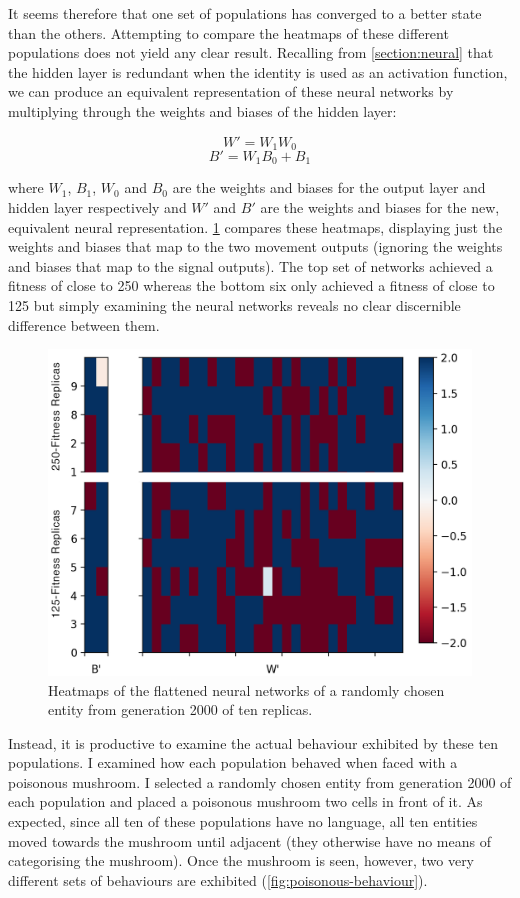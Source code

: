 \documentclass[12pt,a4paper]{report}
\begin{document}
It seems therefore that one set of populations has converged to a better state than the others. Attempting to compare the heatmaps of these different populations does not yield any clear result. Recalling from \cref{section:neural} that the hidden layer is redundant when the identity is used as an activation function, we can produce an equivalent representation of these neural networks by multiplying through the weights and biases of the hidden layer:

$$ W' = W_1 W_0 $$
$$ B' = W_1 B_0 + B_1 $$

where $W_1$, $B_1$, $W_0$ and $B_0$ are the weights and biases for the output layer and hidden layer respectively and $W'$ and $B'$ are the weights and biases for the new, equivalent neural representation. \cref{fig:compare} compares these heatmaps, displaying just the weights and biases that map to the two movement outputs (ignoring the weights and biases that map to the signal outputs). The top set of networks achieved a fitness of close to 250 whereas the bottom six only achieved a fitness of close to 125 but simply examining the neural networks reveals no clear discernible difference between them.

\begin{figure}[t]
  \centering
  \captionsetup{width=.9\linewidth}
  \includegraphics[width=.9\linewidth]{results/compare2}
  \caption{Heatmaps of the flattened neural networks of a randomly chosen entity from generation 2000 of ten replicas.}
  \label{fig:compare}
\end{figure}

Instead, it is productive to examine the actual behaviour exhibited by these ten populations. I examined how each population behaved when faced with a poisonous mushroom. I selected a randomly chosen entity from generation 2000 of each population and placed a poisonous mushroom two cells in front of it. As expected, since all ten of these populations have no language, all ten entities moved towards the mushroom until adjacent (they otherwise have no means of categorising the mushroom). Once the mushroom is seen, however, two very different sets of behaviours are exhibited (\cref{fig:poisonous-behaviour}).
\end{document}
